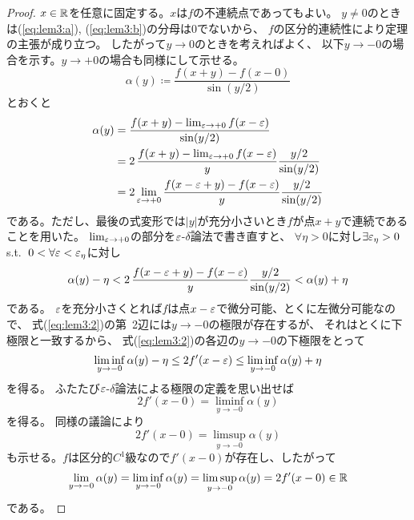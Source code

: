 \documentclass[report]{jlreq}
\begin{document}
\begin{proof}
    $x \in \mathbb{R}$を任意に固定する。$x$は$f$の不連続点であってもよい。
    $y \neq 0$のときは(\ref{eq:lem3:a}), (\ref{eq:lem3:b})の分母は$0$でないから、
    $f$の区分的連続性により定理の主張が成り立つ。
    したがって$y \to 0$のときを考えればよく、
    以下$y \to -0$の場合を示す。$y \to +0$の場合も同様にして示せる。
    \begin{equation}
        \alpha(y) \coloneqq \dfrac{f(x + y) - f(x - 0)}{\sin(y/2)}
    \end{equation}
    とおくと
    \begin{equation}
        \begin{split}
            \alpha(y)
                &= \frac{f(x + y) - \lim_{\varepsilon \to +0} f(x - \varepsilon)}{\sin(y/2)} \\
                &= 2\, \frac{f(x + y) - \lim_{\varepsilon \to +0} f(x - \varepsilon)}{y} \frac{y/2}{\sin(y/2)} \\
                &= 2 \lim_{\varepsilon \to +0} \frac{f(x - \varepsilon + y) - f(x - \varepsilon)}{y} \frac{y/2}{\sin(y/2)}
        \end{split}
    \end{equation}
    である。ただし、最後の式変形では$|y|$が充分小さいとき$f$が点$x + y$で連続であることを用いた。
    $\lim_{\varepsilon \to +0}$の部分を$\varepsilon$-$\delta$論法で書き直すと、
    $\forall \eta > 0$に対し$\exists \varepsilon_\eta > 0\;$ s.t. $\; 0 < \forall \varepsilon < \varepsilon_\eta$に対し
    \begin{equation}
        \alpha(y) - \eta
            < 2\, \frac{f(x - \varepsilon + y) - f(x - \varepsilon)}{y} \frac{y/2}{\sin(y/2)}
            < \alpha(y) + \eta
            \label{eq:lem3:2}
    \end{equation}
    である。
    $\varepsilon$を充分小さくとれば$f$は点$x - \varepsilon$で微分可能、とくに左微分可能なので、
    式(\ref{eq:lem3:2})の第~2辺には$y \to -0$の極限が存在するが、
    それはとくに下極限と一致するから、
    式(\ref{eq:lem3:2})の各辺の$y \to -0$の下極限をとって
    \begin{equation}
        \liminf_{y \to -0} \alpha(y) - \eta \le 2 f'(x - \varepsilon) \le \liminf_{y \to -0} \alpha(y) + \eta
    \end{equation}
    を得る。
    ふたたび$\varepsilon$-$\delta$論法による極限の定義を思い出せば
    \begin{equation}
        2 f'(x - 0) = \liminf_{y \to -0} \alpha(y)
    \end{equation}
    を得る。
    同様の議論により
    \begin{equation}
        2 f'(x - 0) = \limsup_{y \to -0} \alpha(y)
    \end{equation}
    も示せる。$f$は区分的$C^1$級なので$f'(x - 0)$が存在し、したがって
    \begin{equation}
        \lim_{y \to -0} \alpha(y)
            = \liminf_{y \to -0} \alpha(y)
            = \limsup_{y \to -0} \alpha(y)
            = 2 f'(x - 0)
            \in \mathbb{R}
    \end{equation}
    である。
\end{proof}
\end{document}

